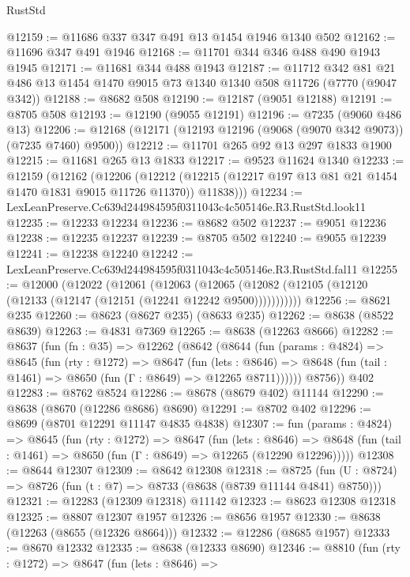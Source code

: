 \begin{lexlean}{RustStd}
\begin{coremodule}
@12159 := @11686 @337 @347 @491 @13 @1454 @1946 @1340 @502
@12162 := @11696 @347 @491 @1946
@12168 := @11701 @344 @346 @488 @490 @1943 @1945
@12171 := @11681 @344 @488 @1943
@12187 := @11712
    @342
    @81
    @21
    @486
    @13
    @1454
    @1470
    @9015
    @73
    @1340
    @1340
    @508
    @11726
    (@7770 (@9047 @342))
@12188 := @8682 @508
@12190 := @12187 (@9051 @12188)
@12191 := @8705 @508
@12193 := @12190 (@9055 @12191)
@12196 := @7235 (@9060 @486 @13)
@12206 := @12168 (@12171 (@12193 @12196 (@9068 (@9070 @342 @9073)) (@7235 @7460) @9500))
@12212 := @11701 @265 @92 @13 @297 @1833 @1900
@12215 := @11681 @265 @13 @1833
@12217 := @9523 @11624 @1340
@12233 := @12159
    (@12162
      (@12206
        (@12212 (@12215 (@12217 @197 @13 @81 @21 @1454 @1470 @1831 @9015 @11726 @11370)) @11838)))
@12234 := LexLeanPreserve.Cc639d244984595f0311043c4c505146e.R3.RustStd.look11
@12235 := @12233 @12234
@12236 := @8682 @502
@12237 := @9051 @12236
@12238 := @12235 @12237
@12239 := @8705 @502
@12240 := @9055 @12239
@12241 := @12238 @12240
@12242 := LexLeanPreserve.Cc639d244984595f0311043c4c505146e.R3.RustStd.fal11
@12255 := @12000
    (@12022
      (@12061
        (@12063
          (@12065 (@12082 (@12105 (@12120 (@12133 (@12147 (@12151 (@12241 @12242 @9500)))))))))))
@12256 := @8621 @235
@12260 := @8623 (@8627 @235) (@8633 @235)
@12262 := @8638 (@8522 @8639)
@12263 := @4831 @7369
@12265 := @8638 (@12263 @8666)
@12282 := @8637
    (fun (fn : @35) =>
    @12262
      (@8642
        (@8644
          (fun (params : @4824) =>
          @8645
            (fun (rty : @1272) =>
            @8647
              (fun (lets : @8646) =>
              @8648 (fun (tail : @1461) => @8650 (fun (Γ : @8649) => @12265 @8711))))))
        @8756))
    @402
@12283 := @8762 @8524
@12286 := @8678 (@8679 @402) @11144
@12290 := @8638 (@8670 (@12286 @8686) @8690)
@12291 := @8702 @402
@12296 := @8699 (@8701 @12291 @11147 @4835 @4838)
@12307 := fun (params : @4824) =>
  @8645
    (fun (rty : @1272) =>
    @8647
      (fun (lets : @8646) =>
      @8648 (fun (tail : @1461) => @8650 (fun (Γ : @8649) => @12265 (@12290 @12296)))))
@12308 := @8644 @12307
@12309 := @8642 @12308
@12318 := @8725
    (fun (U : @8724) => @8726 (fun (t : @7) => @8733 (@8638 (@8739 @11144 @4841) @8750)))
@12321 := @12283 (@12309 @12318) @11142
@12323 := @8623 @12308 @12318
@12325 := @8807 @12307 @1957
@12326 := @8656 @1957
@12330 := @8638 (@12263 (@8655 (@12326 @8664)))
@12332 := @12286 (@8685 @1957)
@12333 := @8670 @12332
@12335 := @8638 (@12333 @8690)
@12346 := @8810
    (fun (rty : @1272) =>
    @8647
      (fun (lets : @8646) =>

\end{coremodule}
\end{lexlean}
